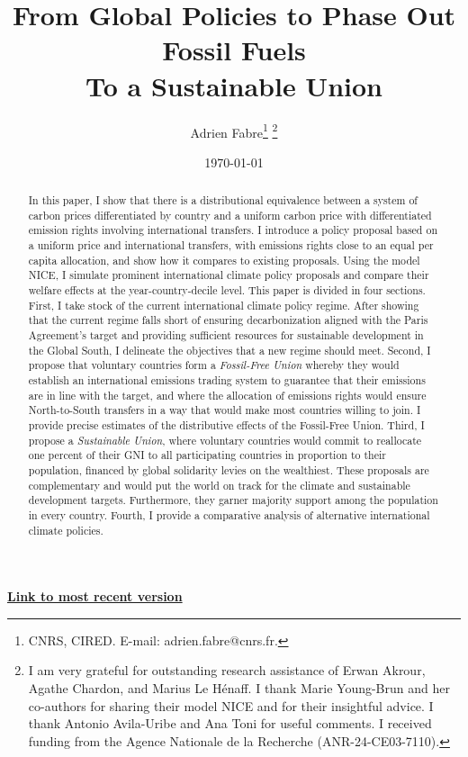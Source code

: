\documentclass[12pt,english]{article}
\title{From Global Policies to Phase Out Fossil Fuels\\To a Sustainable Union}
\author{Adrien Fabre\footnote{CNRS, CIRED. E-mail: adrien.fabre@cnrs.fr.} \footnote{I am very grateful for outstanding research assistance of Erwan Akrour, Agathe Chardon, and Marius Le Hénaff. I thank Marie Young-Brun and her co-authors for sharing their model NICE and for their insightful advice. I thank Antonio Avila-Uribe and Ana Toni for useful comments. I received funding from the Agence Nationale de la Recherche (ANR-24-CE03-7110).}}
\date{\today} %
\newcommand{\bo}[1]{\textbf{#1}}
\begin{document}
\sloppy
\maketitle

\vspace{-1cm}
\begin{center}
{\bo{\href{https://github.com/bixiou/global_tax_attitudes/raw/main/paper/global_climate_policies.pdf}{Link to most recent version}}}
\end{center}


\begin{abstract}

In this paper, I show that there is a distributional equivalence between a system of carbon prices differentiated by country and a uniform carbon price with differentiated emission rights involving international transfers. I introduce a policy proposal based on a uniform price and international transfers, with emissions rights close to an equal per capita allocation, and show how it compares to existing proposals. Using the model NICE, I simulate prominent international climate policy proposals and compare their welfare effects at the year-country-decile level. 
This paper is divided in four sections. First, I take stock of the current international climate policy regime. After showing that the current regime falls short of ensuring decarbonization aligned with the Paris Agreement's target and providing sufficient resources for sustainable development in the Global South, I delineate the objectives that a new regime should meet. Second, I propose that voluntary countries form a \textit{Fossil-Free Union} whereby they would establish an international emissions trading system to guarantee that their emissions are in line with the target, and where the allocation of emissions rights would ensure North-to-South transfers in a way that would make most countries willing to join. I provide precise estimates of the distributive effects of the Fossil-Free Union. Third, I propose a \textit{Sustainable Union}, where voluntary countries would commit to reallocate one percent of their GNI to all participating countries in proportion to their population, financed by global solidarity levies on the wealthiest. These proposals are complementary and would put the world on track for the climate and sustainable development targets. Furthermore, they garner majority support among the population in every country. Fourth, I provide a comparative analysis of alternative international climate policies.


\end{abstract}
\end{document}
